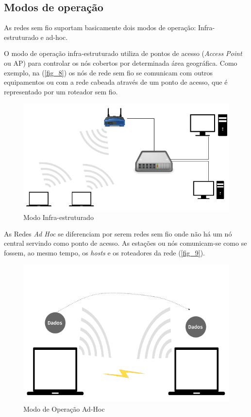 \documentclass[
12pt,				%
openright,			%
oneside,			%
a4paper,			%
brazil,				%
]{abntex2}
\begin{document}
	\subsection{Modos de operação}
	
	\par As redes sem fio suportam basicamente dois modos de operação: Infra-estruturado e ad-hoc.
	
	\par O modo de operação infra-estruturado utiliza de pontos de acesso (\textit{Access Point} ou AP) para controlar os nós cobertos por determinada área geográfica. Como exemplo, na (\autoref{fig_8}) os nós de rede sem fio se comunicam com outros equipamentos ou com a rede cabeada através de um ponto de acesso, que é representado por um roteador sem fio.
	
	\begin{figure} [H]
		\centering
		\includegraphics[scale=.5]{figuras/cap2/08ModoInfra-estruturado}
		\caption{\label{fig_8}Modo Infra-estruturado}
	\end{figure}		
	
	\par As Redes \textit{Ad Hoc} se diferenciam por serem redes sem fio onde não há um nó central servindo como ponto de acesso. As estações ou nós comunicam-se como se fossem, ao mesmo tempo, os \textit{hosts} e os roteadores da rede (\autoref{fig_9}).
	
	\begin{figure} [H]
		\centering
		\includegraphics[scale=.3]{figuras/cap2/09ModosdeOperacaoAdHoc}
		\caption{\label{fig_9}Modo de Operação Ad-Hoc}
	\end{figure}
	
\end{document}
